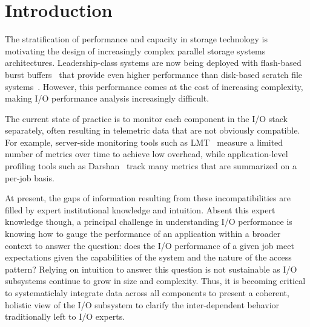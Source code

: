 \section{Introduction} \label{sec:introduction}

The stratification of performance and capacity in storage technology is motivating the design of increasingly complex parallel storage systems architectures.
Leadership-class systems are now being deployed with flash-based burst buffers~\cite{Henseler2016} that provide even higher performance than disk-based scratch file systems~\cite{Bhimji2016}.
However, this performance comes at the cost of increasing complexity, making I/O performance analysis increasingly difficult.

The current state of practice is to monitor each component in the I/O stack separately, often resulting in telemetric data that are not obviously compatible.
For example, server-side monitoring tools such as LMT~\cite{lmt} measure a limited number of metrics over time to achieve low overhead, while application-level profiling tools such as Darshan~\cite{carns200924} track many metrics that are summarized on a per-job basis.

At present, the gaps of information resulting from these incompatibilities are filled by expert institutional knowledge and intuition.
Absent this expert knowledge though, a principal challenge in understanding I/O performance is knowing how to gauge the performance of an application within a broader context to answer the question: 
does the I/O performance of a given job meet expectations given the capabilities of the system and the nature of the access pattern?
Relying on intuition to answer this question is not sustainable as I/O subsystems continue to grow in size and complexity.
Thus, it is becoming critical to systematiclaly integrate data across all components to present a coherent, holistic view of the I/O subsystem to clarify the inter-dependent behavior traditionally left to I/O experts.

